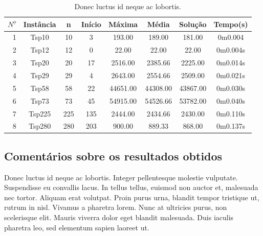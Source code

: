 \documentclass[12pt]{article}
\begin{document}
\begin{table}[h!]
\begin{center}
    \begin{tabular}{r|c|c||c||c|c|c||c} \hline \hline

        $N^{\underline o}$&Instância
        & n & Início & Máxima & Média & Solução  &   Tempo(s) \\
        
        \hline
        1& Tsp10  & 10 & 3 & 193.00 & 189.00 & 181.00 &  0m0.004 \\
        
        \hline
        2& Tsp12  & 12  & 0 & 22.00 & 22.00 & 22.00 &  0m0.004s \\
        
        \hline     
        3& Tsp20 & 20 & 17 & 2516.00 & 2385.66 &  2225.00 &  0m0.014s \\
        
        \hline    
        4& Tsp29 & 29  & 4 & 2643.00 & 2554.66 & 2509.00 &  0m0.021s \\
        
        \hline
        5&  Tsp58  & 58  & 22 & 44651.00 & 44308.00 & 43867.00 &  0m0.030s \\
        
        \hline
        6& Tsp73  & 73 & 45 & 54915.00 & 54526.66 &  53782.00 &  0m0.040s \\
        
        \hline
        7& Tsp225  & 225  & 135 & 2444.00 & 2434.66 &  2430.00 &  0m0.110s \\
        
        \hline
        8& Tsp280 & 280  & 203 & 900.00 & 889.33 &  868.00 &  0m0.137s \\
        
        \hline
        
    \end{tabular}
\caption {Donec luctus id neque ac lobortis.}
\label{table:experimentos}
\end{center}
\end{table}

\subsection{Comentários sobre os resultados obtidos}

Donec luctus id neque ac lobortis. Integer pellentesque molestie vulputate. Suspendisse eu convallis lacus. In tellus tellus, euismod non auctor et, malesuada nec tortor. Aliquam erat volutpat. Proin purus urna, blandit tempor tristique ut, rutrum in nisl. Vivamus a pharetra lorem. Nunc at ultricies purus, non scelerisque elit. Mauris viverra dolor eget blandit malesuada. Duis iaculis pharetra leo, sed elementum sapien laoreet ut.
\end{document}
